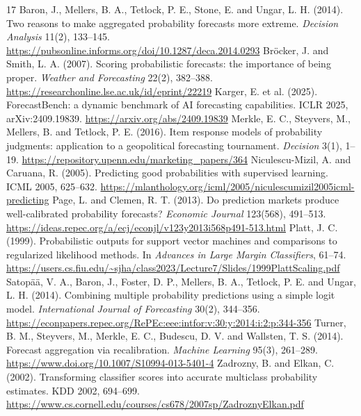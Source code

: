 \documentclass[10pt]{article}
\begin{document}

\begin{thebibliography}{17}\small
{} Baron, J., Mellers, B. A., Tetlock, P. E., Stone, E. and Ungar, L. H. (2014). Two reasons to make aggregated probability forecasts more extreme. \emph{Decision Analysis} 11(2), 133--145. \url{https://pubsonline.informs.org/doi/10.1287/deca.2014.0293}
 Br{\"o}cker, J. and Smith, L. A. (2007). Scoring probabilistic forecasts: the importance of being proper. \emph{Weather and Forecasting} 22(2), 382--388. \url{https://researchonline.lse.ac.uk/id/eprint/22219}
 Karger, E. et al. (2025). ForecastBench: a dynamic benchmark of AI forecasting capabilities. ICLR 2025, arXiv:2409.19839. \url{https://arxiv.org/abs/2409.19839}
 Merkle, E. C., Steyvers, M., Mellers, B. and Tetlock, P. E. (2016). Item response models of probability judgments: application to a geopolitical forecasting tournament. \emph{Decision} 3(1), 1--19. \url{https://repository.upenn.edu/marketing_papers/364}
 Niculescu-Mizil, A. and Caruana, R. (2005). Predicting good probabilities with supervised learning. ICML 2005, 625--632. \url{https://mlanthology.org/icml/2005/niculescumizil2005icml-predicting}
 Page, L. and Clemen, R. T. (2013). Do prediction markets produce well-calibrated probability forecasts? \emph{Economic Journal} 123(568), 491--513. \url{https://ideas.repec.org/a/ecj/econjl/v123y2013i568p491-513.html}
 Platt, J. C. (1999). Probabilistic outputs for support vector machines and comparisons to regularized likelihood methods. In \emph{Advances in Large Margin Classifiers}, 61--74. \url{https://users.cs.fiu.edu/~sjha/class2023/Lecture7/Slides/1999PlattScaling.pdf}
 Satop{\"a}{\"a}, V. A., Baron, J., Foster, D. P., Mellers, B. A., Tetlock, P. E. and Ungar, L. H. (2014). Combining multiple probability predictions using a simple logit model. \emph{International Journal of Forecasting} 30(2), 344--356. \url{https://econpapers.repec.org/RePEc:eee:intfor:v:30:y:2014:i:2:p:344-356}
 Turner, B. M., Steyvers, M., Merkle, E. C., Budescu, D. V. and Wallsten, T. S. (2014). Forecast aggregation via recalibration. \emph{Machine Learning} 95(3), 261--289. \url{https://www.doi.org/10.1007/S10994-013-5401-4}
 Zadrozny, B. and Elkan, C. (2002). Transforming classifier scores into accurate multiclass probability estimates. KDD 2002, 694--699. \url{https://www.cs.cornell.edu/courses/cs678/2007sp/ZadroznyElkan.pdf}

\end{thebibliography}
\end{document}
